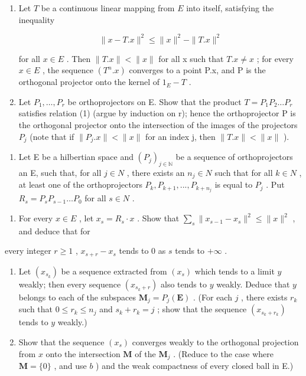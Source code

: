 \begin{enumerate}
\def\labelenumi{\alph{enumi})}
\setcounter{enumi}{1}
\tightlist
\item
  Let \(T\) be a continuous linear mapping from \(E\) into itself, satisfying the inequality

\[
\| x - T. x \| ^ {2} \leqslant \| x \| ^ {2} - \| T. x \| ^ {2}\tag{1}
\]

for all \(x \in E\) . Then \(\|T.x\| < \|x\|\) for all x such that \(T.x \neq x\) ; for every \(x \in E\) , the sequence \((T^{n}.x)\) converges to a point P.x, and P is the orthogonal projector onto the kernel of \(1_{E} - T\) .
\item
  Let \(P_{1}, \ldots, P_{r}\) be orthoprojectors on E. Show that the product \(T = P_{1}P_{2} \ldots P_{r}\) satisfies relation (1) (argue by induction on r); hence the orthoprojector P is the orthogonal projector onto the intersection of the images of the projectors \(P_{j}\) (note that if \(\|P_{j}.x\| < \|x\|\) for an index j, then \(\|T.x\| < \|x\|\) ).
\end{enumerate}

\begin{enumerate}
\def\labelenumi{\arabic{enumi})}
\setcounter{enumi}{8}
\tightlist
\item
  Let E be a hilbertian space and \((P_{j})_{j\in\mathbb{N}}\) be a sequence of orthoprojectors an E, such that, for all \(j\in N\) , there exists an \(n_{j}\in N\) such that for all \(k\in N\) , at least one of the orthoprojectors \(P_{k}, P_{k+1}, ..., P_{k+n_{j}}\) is equal to \(P_{j}\) . Put \(R_{s}=P_{s}P_{s-1}\ldots P_{0}\) for all \(s\in N\) .
\end{enumerate}

\begin{enumerate}
\def\labelenumi{\alph{enumi})}
\tightlist
\item
  For every \(x\in E\) , let \(x_{s}=R_{s}\cdot x\) . Show that \(\sum_{s}\|x_{s-1}-x_{s}\|^{2}\leqslant\|x\|^{2}\) , and deduce that for
\end{enumerate}

every integer \(r \geqslant 1\) , \(x_{s + r} - x_s\) tends to 0 as \(s\) tends to \(+\infty\) .

\begin{enumerate}
\def\labelenumi{\alph{enumi})}
\setcounter{enumi}{1}
\item
  Let \((x_{s_k})\) be a sequence extracted from \((x_s)\) which tends to a limit \(y\) weakly; then every sequence \((x_{s_k + r})\) also tends to \(y\) weakly. Deduce that \(y\) belongs to each of the subspaces \(\mathbf{M}_j = P_j(\mathbf{E})\) . (For each \(j\) , there exists \(r_k\) such that \(0 \leqslant r_k \leqslant n_j\) and \(s_k + r_k = j\) ; show that the sequence \((x_{s_k + r_k})\) tends to \(y\) weakly.)
\item
  Show that the sequence \((x_{s})\) converges weakly to the orthogonal projection from \(x\) onto the intersection \(\mathbf{M}\) of the \(\mathbf{M}_{j}\) . (Reduce to the case where \(\mathbf{M} = \{0\}\) , and use \(b\) ) and the weak compactness of every closed ball in E.)
\end{enumerate}

